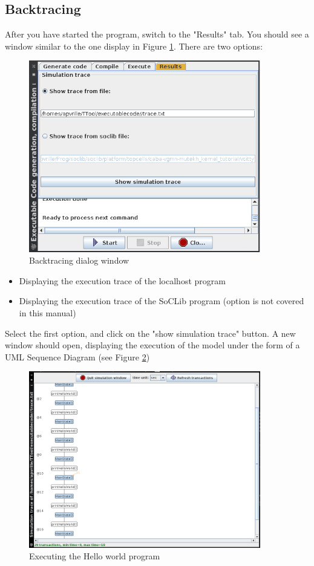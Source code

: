 \documentclass[12pt]{article}
\begin{document}
\subsection{Backtracing}
After you have started the program, switch to the "Results" tab. You should see a window similar to the one display in Figure \ref{fig:resultshelloworld}. There are two options:
\begin{figure}[htbp]
\centering
\includegraphics[width=0.9\textwidth]{figures/resultshelloworld}
\caption{Backtracing dialog window} \label{fig:resultshelloworld}
\end{figure}
\begin{itemize}
\item Displaying the execution trace of the localhost program
\item Displaying the execution trace of the SoCLib program (option is not covered in this manual)
\end{itemize}
Select the first option, and click on the "show simulation trace" button. A new window should open, displaying the execution of the model under the form of a UML Sequence Diagram (see Figure \ref{fig:backtracinghelloworld})

\begin{figure}[htbp]
\centering
\includegraphics[width=0.9\textwidth]{figures/backtracinghelloworld}
\caption{Executing the Hello world program} \label{fig:backtracinghelloworld}
\end{figure}
\end{document}
